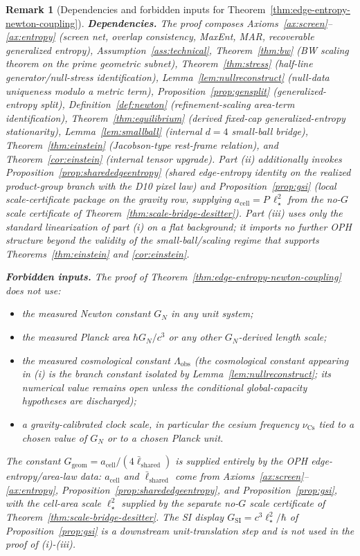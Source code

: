 \documentclass[11pt]{article}
\newtheorem{remark}[theorem]{Remark}
\begin{document}
\begin{remark}[Dependencies and forbidden inputs for Theorem~\ref{thm:edge-entropy-newton-coupling}]\label{rem:edge-entropy-newton-coupling-scope}
\textbf{Dependencies.} The proof composes Axioms~\ref{ax:screen}--\ref{ax:entropy} (screen net, overlap consistency, MaxEnt, MAR, recoverable generalized entropy), Assumption~\ref{ass:technical}, Theorem~\ref{thm:bw} (BW scaling theorem on the prime geometric subnet), Theorem~\ref{thm:stress} (half-line generator/null-stress identification), Lemma~\ref{lem:nullreconstruct} (null-data uniqueness modulo a metric term), Proposition~\ref{prop:gensplit} (generalized-entropy split), Definition~\ref{def:newton} (refinement-scaling area-term identification), Theorem~\ref{thm:equilibrium} (derived fixed-cap generalized-entropy stationarity), Lemma~\ref{lem:smallball} (internal \(d=4\) small-ball bridge), Theorem~\ref{thm:einstein} (Jacobson-type rest-frame relation), and Theorem~\ref{cor:einstein} (internal tensor upgrade). Part (ii) additionally invokes Proposition~\ref{prop:sharededgeentropy} (shared edge-entropy identity on the realized product-group branch with the D10 pixel law) and Proposition~\ref{prop:gsi} (local scale-certificate package on the gravity row, supplying \(a_{\mathrm{cell}}=P\,\ell_\star^2\) from the no-\(G\) scale certificate of Theorem~\ref{thm:scale-bridge-desitter}). Part (iii) uses only the standard linearization of part (i) on a flat background; it imports no further OPH structure beyond the validity of the small-ball/scaling regime that supports Theorems~\ref{thm:einstein} and \ref{cor:einstein}.

\textbf{Forbidden inputs.} The proof of Theorem~\ref{thm:edge-entropy-newton-coupling} does not use:
\begin{itemize}[leftmargin=2em]
\item the measured Newton constant \(G_N\) in any unit system;
\item the measured Planck area \(\hbar G_N/c^3\) or any other \(G_N\)-derived length scale;
\item the measured cosmological constant \(\Lambda_{\mathrm{obs}}\) (the cosmological constant appearing in (i) is the branch constant isolated by Lemma~\ref{lem:nullreconstruct}; its numerical value remains open unless the conditional global-capacity hypotheses are discharged);
\item a gravity-calibrated clock scale, in particular the cesium frequency \(\nu_{\mathrm{Cs}}\) tied to a chosen value of \(G_N\) or to a chosen Planck unit.
\end{itemize}
The constant \(G_{\mathrm{geom}}=a_{\mathrm{cell}}/(4\bar\ell_{\mathrm{shared}})\) is supplied entirely by the OPH edge-entropy/area-law data: \(a_{\mathrm{cell}}\) and \(\bar\ell_{\mathrm{shared}}\) come from Axioms~\ref{ax:screen}--\ref{ax:entropy}, Proposition~\ref{prop:sharededgeentropy}, and Proposition~\ref{prop:gsi}, with the cell-area scale \(\ell_\star^2\) supplied by the separate no-\(G\) scale certificate of Theorem~\ref{thm:scale-bridge-desitter}. The SI display \(G_{\mathrm{SI}}=c^3\ell_\star^2/\hbar\) of Proposition~\ref{prop:gsi} is a downstream unit-translation step and is not used in the proof of (i)-(iii).


\end{remark}
\end{document}
